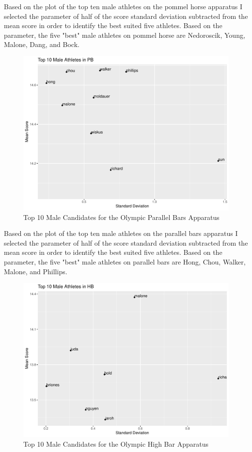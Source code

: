 \documentclass[12pt]{article}
\begin{document}
  Based on the plot of the top ten male athletes on the pommel horse apparatus I selected the parameter of 
  half of the score standard deviation subtracted from the mean score in order to identify the best suited five 
  athletes. Based on the parameter, the five "best" male athletes on pommel horse are Nedoroscik, Young, Malone, 
  Dang, and Bock.

\begin{figure}
    \centering
    \includegraphics[scale=0.6]{MaleAthletesPB.pdf}
    \caption{Top 10 Male Candidates for the Olympic Parallel Bars Apparatus}
    \label{fig:PBM}
  \end{figure}

  Based on the plot of the top ten male athletes on the parallel bars apparatus I selected the parameter of 
  half of the score standard deviation subtracted from the mean score in order to identify the best suited five 
  athletes. Based on the parameter, the five "best" male athletes on parallel bars are Hong, Chou, Walker, Malone, 
  and Phillips.

\begin{figure}
    \centering
    \includegraphics[scale=0.6]{MaleAthletesHB.pdf}
    \caption{Top 10 Male Candidates for the Olympic High Bar Apparatus}
    \label{fig:HBM}
  \end{figure}
\end{document}
